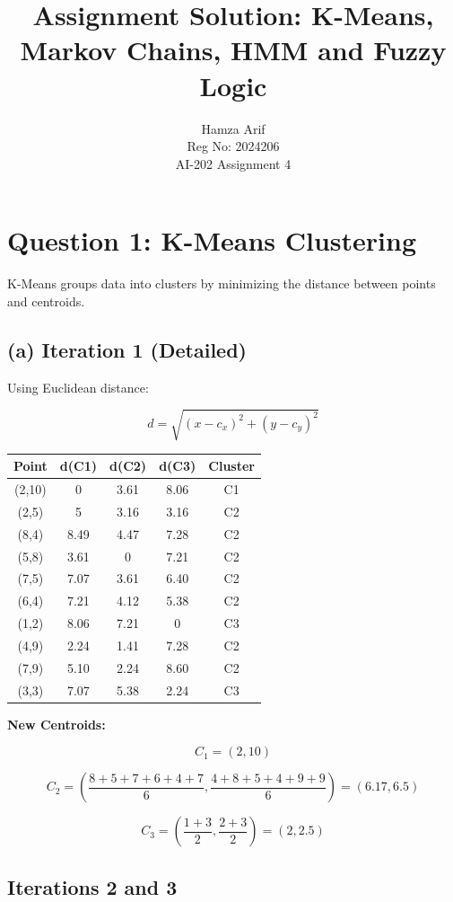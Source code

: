 \documentclass[12pt]{article}
\title{Assignment Solution: K-Means, Markov Chains, HMM and Fuzzy Logic}
\author{
Hamza Arif \\
Reg No: 2024206 \\
AI-202 Assignment 4
}
\date{}
\begin{document}
\maketitle


\section*{Question 1: K-Means Clustering}

K-Means groups data into clusters by minimizing the distance between points and centroids.

\subsection*{(a) Iteration 1 (Detailed)}

Using Euclidean distance:

\[
d = \sqrt{(x - c_x)^2 + (y - c_y)^2}
\]

\begin{longtable}{|c|c|c|c|c|}
\hline
Point & d(C1) & d(C2) & d(C3) & Cluster \\
\hline
(2,10) & 0 & 3.61 & 8.06 & C1 \\
(2,5) & 5 & 3.16 & 3.16 & C2 \\
(8,4) & 8.49 & 4.47 & 7.28 & C2 \\
(5,8) & 3.61 & 0 & 7.21 & C2 \\
(7,5) & 7.07 & 3.61 & 6.40 & C2 \\
(6,4) & 7.21 & 4.12 & 5.38 & C2 \\
(1,2) & 8.06 & 7.21 & 0 & C3 \\
(4,9) & 2.24 & 1.41 & 7.28 & C2 \\
(7,9) & 5.10 & 2.24 & 8.60 & C2 \\
(3,3) & 7.07 & 5.38 & 2.24 & C3 \\
\hline
\end{longtable}

\textbf{New Centroids:}

\[
C_1 = (2,10)
\]

\[
C_2 = \left(\frac{8+5+7+6+4+7}{6}, \frac{4+8+5+4+9+9}{6}\right) = (6.17, 6.5)
\]

\[
C_3 = \left(\frac{1+3}{2}, \frac{2+3}{2}\right) = (2, 2.5)
\]

\subsection*{Iterations 2 and 3}
\end{document}
